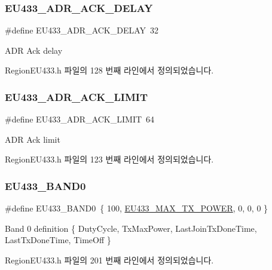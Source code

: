\subsubsection{\texorpdfstring{E\+U433\+\_\+\+A\+D\+R\+\_\+\+A\+C\+K\+\_\+\+D\+E\+L\+AY}{EU433\_ADR\_ACK\_DELAY}}
{\footnotesize\ttfamily \#define E\+U433\+\_\+\+A\+D\+R\+\_\+\+A\+C\+K\+\_\+\+D\+E\+L\+AY~32}

A\+DR Ack delay 

Region\+E\+U433.\+h 파일의 128 번째 라인에서 정의되었습니다.

\mbox{\label{group___r_e_g_i_o_n_e_u433_ga3e1ccf1b708f6851ff62811ee58bb37e}} 
\subsubsection{\texorpdfstring{E\+U433\+\_\+\+A\+D\+R\+\_\+\+A\+C\+K\+\_\+\+L\+I\+M\+IT}{EU433\_ADR\_ACK\_LIMIT}}
{\footnotesize\ttfamily \#define E\+U433\+\_\+\+A\+D\+R\+\_\+\+A\+C\+K\+\_\+\+L\+I\+M\+IT~64}

A\+DR Ack limit 

Region\+E\+U433.\+h 파일의 123 번째 라인에서 정의되었습니다.

\mbox{\label{group___r_e_g_i_o_n_e_u433_gaf5112336b60d5977ad6afc600e5b0154}} 
\subsubsection{\texorpdfstring{E\+U433\+\_\+\+B\+A\+N\+D0}{EU433\_BAND0}}
{\footnotesize\ttfamily \#define E\+U433\+\_\+\+B\+A\+N\+D0~\{ 100, \mbox{\hyperlink{group___r_e_g_i_o_n_e_u433_gaac93ce9446f1e4b5c3c09c9b2ebf2297}{E\+U433\+\_\+\+M\+A\+X\+\_\+\+T\+X\+\_\+\+P\+O\+W\+ER}}, 0, 0, 0 \}}

Band 0 definition \{ Duty\+Cycle, Tx\+Max\+Power, Last\+Join\+Tx\+Done\+Time, Last\+Tx\+Done\+Time, Time\+Off \} 

Region\+E\+U433.\+h 파일의 201 번째 라인에서 정의되었습니다.

